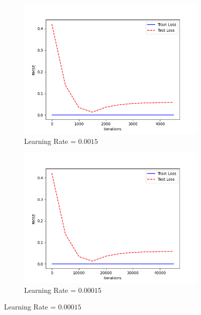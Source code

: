 \documentclass[a4paper, utf8]{ctexart}
\begin{document}
\begin{figure}[htbp]
		\begin{subfigure}{.48\textwidth}
			\centering
			\includegraphics[width=.9\linewidth]{./figure/1(b)3.png}
			\caption{Learning Rate = $0.0015$}
		\end{subfigure}
		\begin{subfigure}{.48\textwidth}
			\centering
			\includegraphics[width=.9\linewidth]{./figure/1(b)4.png}
			\caption{Learning Rate = $0.00015$}
		\end{subfigure}
		

\end{figure}
\end{document}
